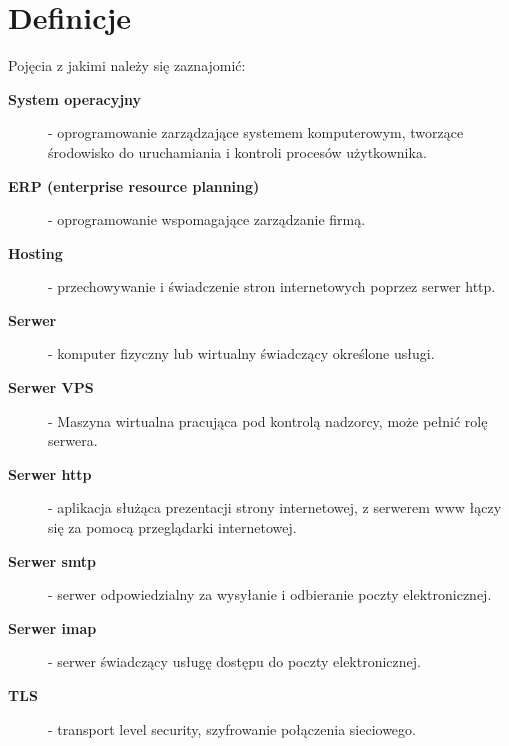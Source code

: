 \section*{Definicje}
	Pojęcia z jakimi należy się zaznajomić:
	\begin{description}
	
		\item[\textbf{System operacyjny}] - oprogramowanie zarządzające systemem komputerowym, tworzące środowisko do uruchamiania i kontroli procesów użytkownika.
	
		\item[\textbf{ERP (enterprise resource planning)}] - oprogramowanie wspomagające zarządzanie firmą.

		\item[\textbf{Hosting}] -  przechowywanie i świadczenie stron internetowych poprzez serwer http.
		
		\item[\textbf{Serwer}] - komputer fizyczny lub wirtualny świadczący określone usługi.
		
		\item[\textbf{Serwer VPS}] -  Maszyna wirtualna pracująca pod kontrolą nadzorcy, może pełnić rolę serwera.
		
		\item[\textbf{Serwer http}] -  aplikacja służąca prezentacji strony internetowej, z serwerem www łączy się za pomocą przeglądarki internetowej.
		
		\item[\textbf{Serwer smtp}] -  serwer odpowiedzialny za wysyłanie i odbieranie poczty elektronicznej.
		
		\item[\textbf{Serwer imap}] -  serwer świadczący usługę dostępu do poczty elektronicznej.
		
		\item[\textbf{TLS}] - transport level security, szyfrowanie połączenia sieciowego.
	
	\end{description}
